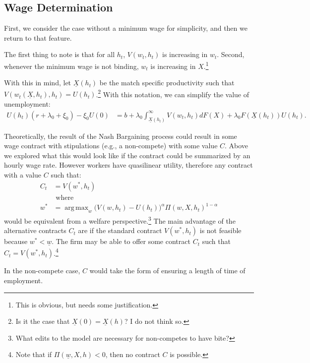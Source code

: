 \documentclass[11pt]{article}
\DeclareMathOperator*{\argmax}{arg\,max}
\begin{document}
\subsection[Wage Determination]{Wage Determination}%
\label{sub:wage_determination}

First, we consider the case without a minimum wage for simplicity, and then
we return to that feature.

The first thing to note is that for all $h_t$,  $V(w_t,h_t)$ is increasing
in  $w_t$. Second, whenever the minimum wage is not binding, $w_t$ is
increasing in $X$.\footnote{This is obvious, but needs some justification.}

With this in mind, let $\underline{X}(h_t)$ be the match specific productivity such that
$V(w_t(\underline{X},h_t),h_t) = U(h_t)$.\footnote{Is it the case that
$\underline{X}(0) = \underline{X}(h)$? I do not think so.} With this
notation, we can simplify the value of unemployment:
\begin{align*}
    U(h_t)(r+\lambda_0+\xi_0) - \xi_0 U(0) &= b + \lambda_0
    \int_{\underline{X}(h_t)}^{\infty} V(w_t, h_t) dF(X) +
    \lambda_0F(\underline{X}(h_t)) U(h_t)
.\end{align*}


Theoretically, the result of the Nash Bargaining process could result in
some wage contract with stipulations (e.g., a non-compete) with some value
$C$. Above we explored what this would look like if the contract could be
summarized by an hourly wage rate. However workers have quasilinear
utility, therefore any contract with a value $C$ such that:
 \begin{align*}
     C_t &= V(w^{*},h_t) \\
         &\text{ where }\\
    w^{*} &=  \argmax_w \big ( V(w,h_t) - U(h_t) \big )^{\alpha} \Pi(w,X,h_t)^{1-\alpha}
\end{align*}
would be equivalent from a welfare perspective.\footnote{What edits to the
model are necessary for non-competes to have bite?} The main advantage of
the alternative contracts $C_t$ are if the standard contract $V(w^{*},h_t)$
is not feasible because $w^{*} < \underline{w}$. The firm may be able to
offer some contract $C_t$ such that $C_t = V(w^{*},h_t)$.\footnote{Note
that if $\Pi(\underline{w},X,h) < 0$, then no contract $C$ is
possible.}

In the non-compete case, $C$ would take the form of ensuring a length of
time of employment.
\end{document}
